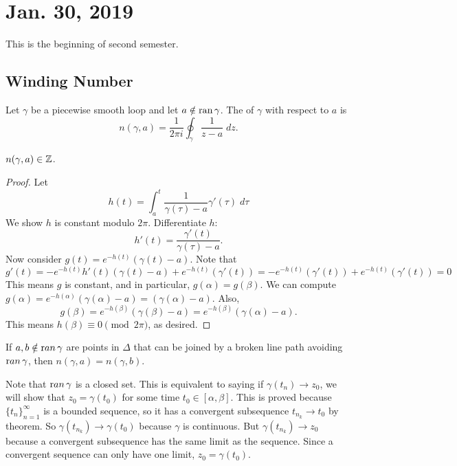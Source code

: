 \documentclass[notes]{subfile}
\begin{document}
\section{Jan. 30, 2019}
This is the beginning of second semester.

\subsection{Winding Number}

\begin{definition}
    Let $\gamma$ be a piecewise smooth loop and let
    $a \notin \operatorname{ran}{\gamma}$.
    The  of $\gamma$ with respect to $a$ is
    \[ n(\gamma, a) = \frac{1}{2\pi i} \oint_{\gamma} \frac{1}{z-a} \; dz. \]
\end{definition}

\begin{theorem}
    $n(\gamma, a) \in \operatorname{\mathbb{Z}}$.
\end{theorem}

\begin{proof}
    Let
    \[ h(t) = \int_a^t \frac{1}{\gamma(\tau)-a}\gamma'(\tau) \; d\tau \]
    We show $h$ is constant modulo $2\pi$.
    Differentiate $h$: 
    \[ h'(t) = \frac{\gamma'(t)}{\gamma(\tau) -a}. \]
    Now consider $g(t) = e^{-h(t)} (\gamma(t) - a)$.
    Note that
    \[ g'(t) = -e^{-h(t)} h'(t) (\gamma(t) - a) + 
        e^{-h(t)} (\gamma'(t))
    = -e^{-h(t)} (\gamma'(t)) +  e^{-h(t)} (\gamma'(t)) = 0 \]
    This means $g$ is constant, and in particular, $g(\alpha) = g(\beta)$.
    We can compute $g(\alpha) = e^{-h(\alpha)} (\gamma(\alpha) - a) = (\gamma(\alpha) - a)$.
    Also, 
    \[ g(\beta) = e^{-h(\beta)}(\gamma(\beta) - a) = e^{-h(\beta)}
    (\gamma(\alpha) - a). \]
    This means $h(\beta) \equiv 0 \pmod{2\pi}$, as desired. 
\end{proof}


\begin{cor}
    If $a,b \notin {\text ran} \,  \gamma$ are points in $\Delta$ that can be joined by a broken line path avoiding ${\text ran} \, \gamma$, then $n(\gamma, a) = n(\gamma, b)$.
\end{cor}

Note that ${\text ran} \, \gamma$ is a closed set.  
This is equivalent to saying if $\gamma (t_n) \to z_0$, we will show that $z_0 = \gamma(t_0)$ for some time $t_0 \in [\alpha, \beta]$.
This is proved because $\{ t_n \}_{n=1}^{\infty}$ is a bounded sequence, so it has a convergent subsequence $t_{n_k} \to t_0$ by  theorem.
So $\gamma(t_{n_k}) \to \gamma(t_0)$ because $\gamma$ is continuous.
But $\gamma(t_{n_k}) \to z_0$ because a convergent subsequence has the same limit as the sequence.
Since a convergent sequence can only have one limit, $z_0 = \gamma(t_0)$.
\end{document}
